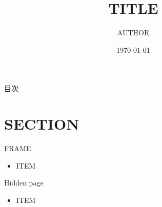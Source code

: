 \documentclass[dvipdfmx,uplatex,aspectratio=169,t,14pt]{beamer}
\title{TITLE}
\date{\today}
\author{AUTHOR}
\institute{INSTITUTE}
\begin{document}
\maketitle

\begin{frame}{目次}
    \tableofcontents[hideallsubsections]
\end{frame}

\section{SECTION}

\begin{frame}{FRAME}
    \begin{itemize}
        \item ITEM
    \end{itemize}
\end{frame}

\appendix

\begin{frame}[noframenumbering]{Hidden page}
    \begin{itemize}
        \item ITEM
    \end{itemize}
\end{frame}
\end{document}
